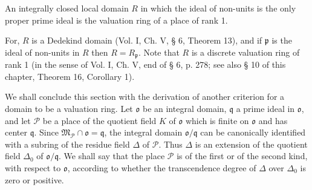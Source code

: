 An integrally closed local domain $R$ in which the ideal of non-units is the only proper prime ideal is the valuation ring of a place of rank 1.

For, $R$ is a Dedekind domain (Vol. I, Ch. V, § 6, Theorem 13), and if $\mathfrak{p}$ is the ideal of non-units in $R$ then $R = R_{\mathfrak{p}}$. Note that $R$ is a discrete valuation ring of rank 1 (in the sense of Vol. I, Ch. V, end of § 6, p. 278; see also § 10 of this chapter, Theorem 16, Corollary 1).

We shall conclude this section with the derivation of another criterion for a domain to be a valuation ring. Let $\mathfrak{o}$ be an integral domain, $\mathfrak{q}$ a prime ideal in $\mathfrak{o}$, and let $\mathcal{P}$ be a place of the quotient field $K$ of $\mathfrak{o}$ which is finite on $\mathfrak{o}$ and has center $\mathfrak{q}$. Since $\mathfrak{M}_{\mathcal{P}} \cap \mathfrak{o} = \mathfrak{q}$, the integral domain $\mathfrak{o}/\mathfrak{q}$ can be canonically identified with a subring of the residue field $\Delta$ of $\mathcal{P}$. Thus $\Delta$ is an extension of the quotient field $\Delta_0$ of $\mathfrak{o}/\mathfrak{q}$. We shall say that the place $\mathcal{P}$ is of the first or of the second kind, with respect to $\mathfrak{o}$, according to whether the transcendence degree of $\Delta$ over $\Delta_0$ is zero or positive.